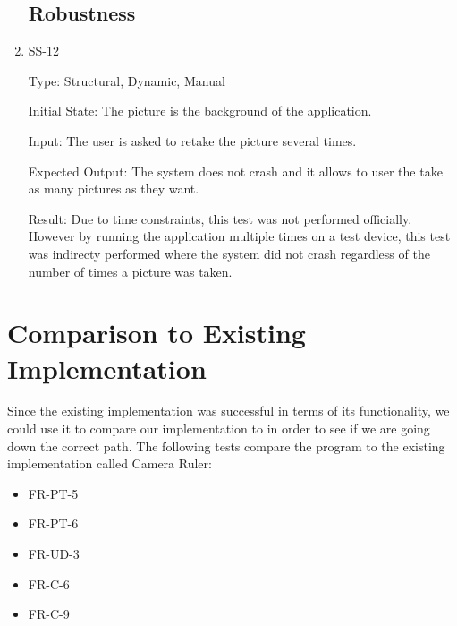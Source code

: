 \documentclass[12pt, titlepage]{article}
\begin{document}
\begin{enumerate}
\subsection{Robustness}
\item{SS-12\\}

Type: Structural, Dynamic, Manual

Initial State: The picture is the background of the application.

Input: The user is asked to retake the picture several times.

Expected Output: The system does not crash and it allows to user the take as many pictures as they want.

Result: Due to time constraints, this test was not performed officially. However by running the application multiple times on a test device, this test was indirecty performed where the system did not crash regardless of the number of times a picture was taken.

\end{enumerate}
\section{Comparison to Existing Implementation}	

Since the existing implementation was successful in terms of its functionality, we could use it to compare our implementation to in order to see if we are going down the correct path. The following tests compare the program to the existing implementation called Camera Ruler:

\begin{itemize}
\item{FR-PT-5\\}
\item{FR-PT-6\\}
\item{FR-UD-3\\}
\item{FR-C-6\\}
\item{FR-C-9\\}

\end{itemize}
\end{document}
